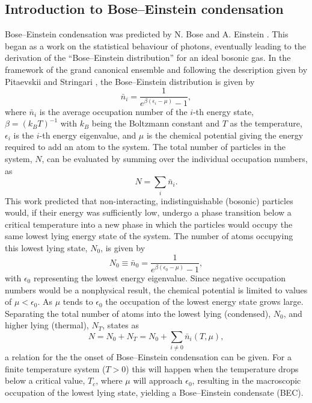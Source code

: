 \subsection{Introduction to Bose--Einstein condensation}\label{sub:becintro}
Bose--Einstein condensation was predicted by N. Bose and A. Einstein \cite{BEC:Ketterle_revmod_2002}. This began as a work on the statistical behaviour of photons, eventually leading to the derivation of the ``Bose--Einstein distribution'' for an ideal bosonic gas.
In the framework of the grand canonical ensemble and following the description given by Pitaevskii and Stringari \cite[chap. 2]{BK:Pitaevskii_Stringari_2003}, the Bose--Einstein distribution is given by
\begin{equation}
\bar{n}_i = \frac{1}{e^{\beta(\epsilon_i - \mu)} -1},
\end{equation}
where $\bar{n}_i$ is the average occupation number of the $i$-th energy state, $\beta=(k_BT)^{-1}$ with $k_B$ being the Boltzmann constant and $T$ as the temperature, $\epsilon_i$ is the $i$-th energy eigenvalue, and $\mu$ is the chemical potential giving the energy required to add an atom to the system.
The total number of particles in the system, $N$, can be evaluated by summing over the individual occupation numbers, as
\begin{equation}
N=\displaystyle\sum_i \bar{n}_i.
\end{equation}
This work predicted that non-interacting, indistinguishable (bosonic) particles would, if their energy was sufficiently low, undergo a phase transition below a critical temperature into a new phase in which the particles would occupy the same lowest lying energy state of the system. The number of atoms occupying this lowest lying state, $N_0$, is given by
\begin{equation}
N_0 \equiv \bar{n}_0 = \frac{1}{e^{\beta(\epsilon_0 - \mu)} - 1},
\end{equation}
with $\epsilon_0$ representing the lowest energy eigenvalue. Since negative occupation numbers would be a nonphysical result, the chemical potential is limited to values of $\mu < \epsilon_0$. As $\mu$ tends to $\epsilon_0$ the occupation of the lowest energy state grows large. Separating the total number of atoms into the lowest lying (condensed), $N_0$, and higher lying (thermal), $N_T$, states as
\begin{equation}
N = N_0 + N_T = N_0 + \displaystyle\sum_{i\neq 0}\bar{n}_i(T,\mu),
\end{equation}
a relation for the the onset of Bose--Einstein condensation can be given. For a finite temperature system ($T>0$) this will happen when the temperature drops below a critical value, $T_c$, where $\mu$ will approach $\epsilon_0$, resulting in the macroscopic occupation of the lowest lying state, yielding a Bose--Einstein condensate (BEC).

